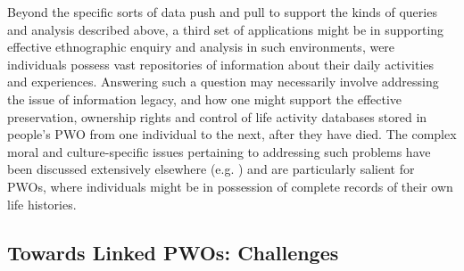 \documentclass{sig-alternate}
\begin{document}
Beyond the specific sorts of data push and pull to support the kinds of queries and analysis described above, a third set of applications might be in supporting effective ethnographic enquiry and analysis in such environments, were individuals possess vast repositories of information about their daily activities and experiences.  Answering such a question may necessarily involve addressing the issue of information legacy, and how one might support the effective preservation, ownership rights and control of life activity databases stored in people's PWO from one individual to the next, after they have died.  The complex moral and culture-specific issues pertaining to addressing such problems have been discussed extensively elsewhere (e.g. \cite{shields1996cultures,fernandez2001moral}) and are particularly salient for PWOs, where individuals might be in possession of complete records of their own life histories.

\subsection{Towards Linked PWOs: Challenges}


\end{document}

